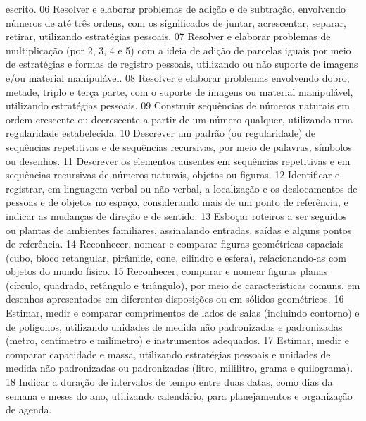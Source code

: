 {{{{					escrito.
				}
				{06}{%
					Resolver e elaborar problemas de adição e de subtração, envolvendo números
					de até três ordens, com os significados de juntar, acrescentar, separar, retirar, utilizando
					estratégias pessoais.
				}
				{07}{%
					Resolver e elaborar problemas de multiplicação (por 2, 3, 4 e 5) com a ideia de
					adição de parcelas iguais por meio de estratégias e formas de registro pessoais, utilizando ou
					não suporte de imagens e/ou material manipulável.
				}
				{08}{%
					Resolver e elaborar problemas envolvendo dobro, metade, triplo e terça parte,
					com o suporte de imagens ou material manipulável, utilizando estratégias pessoais.
				}
				{09}{%
					Construir sequências de números naturais em ordem crescente ou decrescente a
					partir de um número qualquer, utilizando uma regularidade estabelecida.
				}
				{10}{%
					Descrever um padrão (ou regularidade) de sequências repetitivas e de sequências
					recursivas, por meio de palavras, símbolos ou desenhos.
				}
				{11}{%
					Descrever os elementos ausentes em sequências repetitivas e em sequências
					recursivas de números naturais, objetos ou figuras.
				}
				{12}{%
					Identificar e registrar, em linguagem verbal ou não verbal, a localização e os
					deslocamentos de pessoas e de objetos no espaço, considerando mais de um ponto de
					referência, e indicar as mudanças de direção e de sentido.
				}
				{13}{%
					Esboçar roteiros a ser seguidos ou plantas de ambientes familiares, assinalando
					entradas, saídas e alguns pontos de referência.
				}
				{14}{%
					Reconhecer, nomear e comparar figuras geométricas espaciais (cubo, bloco
					retangular, pirâmide, cone, cilindro e esfera), relacionando-as com objetos do mundo físico.
				}
				{15}{%
					Reconhecer, comparar e nomear figuras planas (círculo, quadrado, retângulo
					e triângulo), por meio de características comuns, em desenhos apresentados em diferentes
					disposições ou em sólidos geométricos.
				}
				{16}{%
					Estimar, medir e comparar comprimentos de lados de salas (incluindo contorno)
					e de polígonos, utilizando unidades de medida não padronizadas e padronizadas (metro,
					centímetro e milímetro) e instrumentos adequados.
				}
				{17}{%
					Estimar, medir e comparar capacidade e massa, utilizando estratégias pessoais e
					unidades de medida não padronizadas ou padronizadas (litro, mililitro, grama e quilograma).
				}
				{18}{%
					Indicar a duração de intervalos de tempo entre duas datas, como dias da semana
					e meses do ano, utilizando calendário, para planejamentos e organização de agenda.
}}}}
